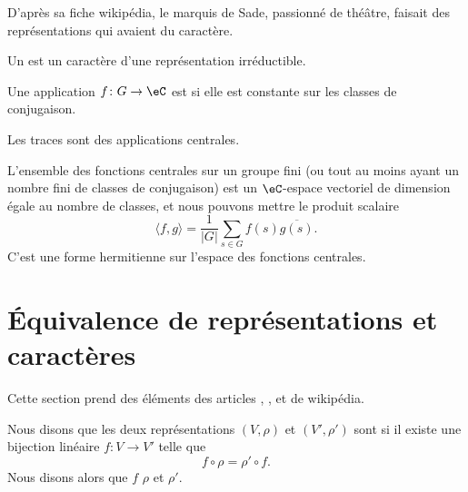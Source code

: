 \tiny
D'après sa fiche wikipédia, le marquis de Sade, passionné de théâtre, faisait des représentations qui avaient du caractère.
\normalsize


Un  est un caractère d'une représentation irréductible.

\begin{definition}
	Une application \( f\colon G\to \eC\) est  si elle est constante sur les classes de conjugaison.
\end{definition}
Les traces sont des applications centrales.

L'ensemble des fonctions centrales sur un groupe fini (ou tout au moins ayant un nombre fini de classes de conjugaison) est un \( \eC\)-espace vectoriel de dimension égale au nombre de classes, et nous pouvons mettre le produit scalaire
\begin{equation}    \label{EqJrEpVI}
	\langle f, g\rangle =\frac{1}{ | G | }\sum_{s\in G}f(s)\overline{ g(s) }.
\end{equation}
C'est une forme hermitienne sur l'espace des fonctions centrales.

\section{Équivalence de représentations et caractères}

Cette section prend des éléments des articles , ,  et  de wikipédia.

\begin{definition}
	Nous disons que les deux représentations \( (V,\rho)\) et \( (V',\rho')\) sont  si il existe une bijection linéaire \( f\colon V\to V'\) telle que
	\begin{equation}
		f\circ \rho=\rho'\circ f.
	\end{equation}
	Nous disons alors que \( f\)  \( \rho\) et \( \rho'\).
\end{definition}

